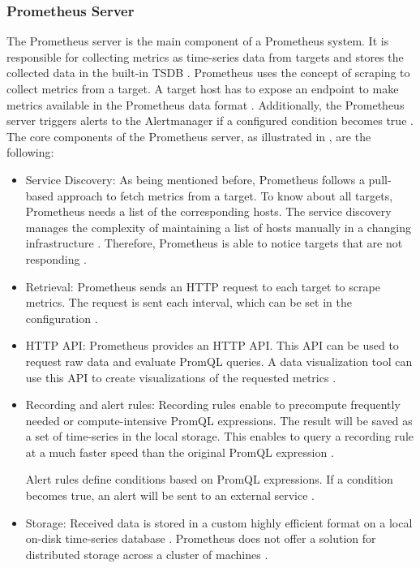 \subsubsection{Prometheus Server}
The Prometheus server is the main component of a Prometheus system. It is responsible for collecting metrics as time-series data from targets and stores the collected data in the built-in TSDB \cite{Bastos2019Prom}. Prometheus uses the concept of scraping to collect metrics from a target. A target host has to expose an endpoint to make metrics available in the Prometheus data format \cite{Pandey2020Monitoring}. Additionally, the Prometheus server triggers alerts to the Alertmanager if a configured condition becomes true \cite{Prom2020Docs}.
The core components of the Prometheus server, as illustrated in , are the following:

\begin{itemize}
\item Service Discovery:
As being mentioned before, Prometheus follows a pull-based approach to fetch metrics from a target. To know about all targets, Prometheus needs a list of the corresponding hosts. The service discovery manages the complexity of maintaining a list of hosts manually in a changing infrastructure \cite{Bastos2019Prom}. Therefore, Prometheus is able to notice targets that are not responding \cite{Brazil2018Prom}.

\item Retrieval:
Prometheus sends an HTTP request to each target to scrape metrics. The request is sent each interval, which can be set in the configuration \cite{Brazil2018Prom}.

\item HTTP API:
Prometheus provides an HTTP API. This API can be used to request raw data and evaluate PromQL queries.
A data visualization tool can use this API to create visualizations of the requested metrics \cite{Brazil2018Prom}.

\item Recording and alert rules:
Recording rules enable to precompute frequently needed or compute-intensive PromQL expressions. The result will be saved as a set of time-series in the local storage. This enables to query a recording rule at a much faster speed than the original PromQL expression \cite{Brazil2018Prom, Prom2020Docs}.

Alert rules define conditions based on PromQL expressions. If a condition becomes true, an alert will be sent to an external service \cite{Prom2020Docs}.

\item Storage:
Received data is stored in a custom highly efficient format on a local on-disk time-series database \cite{Prom2020Docs}. Prometheus does not offer a solution for distributed storage across a cluster of machines \cite{Brazil2018Prom}.
\end{itemize}



